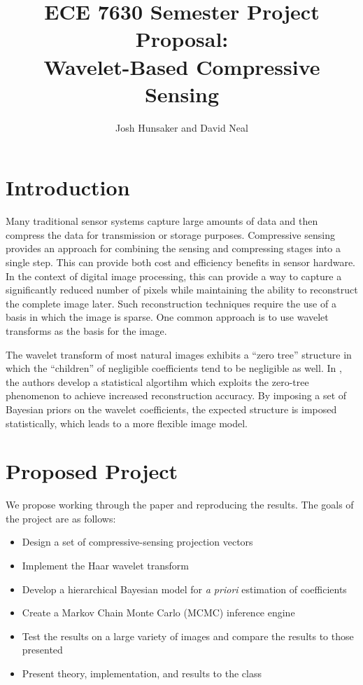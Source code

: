 \documentclass{article}
\title{ECE 7630 Semester Project Proposal: \\ Wavelet-Based Compressive Sensing}
\author{Josh Hunsaker and David Neal}
\begin{document}
\maketitle

\section{Introduction}

Many traditional sensor systems capture large amounts of data and then compress the data for transmission or storage purposes.  Compressive sensing provides an approach for combining the sensing and compressing stages into a single step.  This can provide both cost and efficiency benefits in sensor hardware. In the context of digital image processing, this can provide a way to capture a significantly reduced number of pixels while maintaining the ability to reconstruct the complete image later. Such reconstruction techniques require the use of a basis in which the image is sparse. One common approach is to use wavelet transforms as the basis for the image.

The wavelet transform of most natural images exhibits a ``zero tree'' structure in which the ``children'' of negligible coefficients tend to be negligible as well. In \cite{He09}, the authors develop a statistical algortihm which exploits the zero-tree phenomenon to achieve increased reconstruction accuracy. By imposing a set of Bayesian priors on the wavelet coefficients, the expected structure is imposed statistically, which leads to a more flexible image model.

\section{Proposed Project}

We propose working through the paper and reproducing the results. The goals of the project are as follows:

\begin{itemize}
\item Design a set of compressive-sensing projection vectors
\item Implement the Haar wavelet transform
\item Develop a hierarchical Bayesian model for \emph{a priori} estimation of coefficients
\item Create a Markov Chain Monte Carlo (MCMC) inference engine
\item Test the results on a large variety of images and compare the results to those presented
\item Present theory, implementation, and results to the class
\end{itemize}



\end{document}

